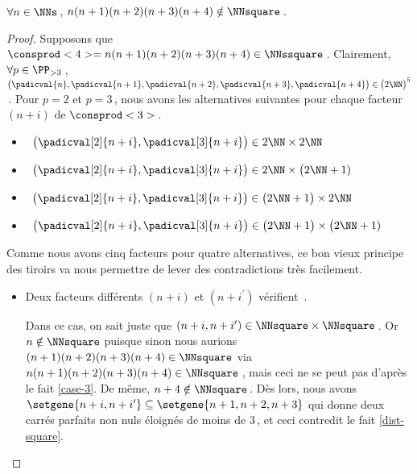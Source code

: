 \begin{fact}
	 $\forall n \in \NNs$\,, $n(n+1)(n+2)(n+3)(n+4) \notin \NNsquare$\,.
\end{fact}




\begin{proof}
    Supposons que $\consprod<4> = n(n+1)(n+2)(n+3)(n+4) \in \NNssquare$\,.
    Clairement, $\forall p \in \PP_{>3}$\,, 
    $\big( \padicval{n} , \padicval{n + 1} , \padicval{n + 2} , \padicval{n + 3} , \padicval{n + 4} \big) \in \big( 2 \NN \big)^5$\,.
    Pour $p = 2$ et $p = 3$\,, nous avons les alternatives suivantes pour chaque facteur $(n+i)$ de $\consprod<3>$\,.
    \begin{itemize}
    	\smallskip
		\item {}\,
		$\big( \padicval[2]{n + i} , \padicval[3]{n + i} \big) \in 2 \NN \times 2 \NN$

    	\smallskip
		\item {}\,
		$\big( \padicval[2]{n + i} , \padicval[3]{n + i} \big) \in 2 \NN \times \big( 2 \NN + 1)$

    	\smallskip
		\item {}\,
		$\big( \padicval[2]{n + i} , \padicval[3]{n + i} \big) \in \big( 2 \NN + 1 \big) \times 2 \NN$

    	\smallskip
		\item {}\,
		$\big( \padicval[2]{n + i} , \padicval[3]{n + i} \big) \in \big( 2 \NN + 1 \big) \times \big( 2 \NN + 1)$
    \end{itemize}
    
    \medskip
    
    Comme nous avons cinq facteurs pour quatre alternatives, ce bon vieux principe des tiroirs va nous permettre de lever des contradictions très facilement.
    \begin{itemize}
    	\item Deux facteurs différents $(n+i)$ et $(n+i^\prime)$ vérifient \,.
		
		\smallskip
		\noindent
		Dans ce cas, on sait juste que $(n+i, n+i^\prime) \in \NNsquare \times \NNsquare$\,.
		Or $n \notin \NNsquare$ puisque sinon nous aurions $(n+1)(n+2)(n+3)(n+4) \in \NNsquare$ via $n(n+1)(n+2)(n+3)(n+4) \in \NNsquare$\,, mais ceci ne se peut pas d'après le fait \ref{case-3}.
		De même, $n+4 \notin \NNsquare$\,.
		Dès lors, nous avons $\setgene{n+i, n+i^\prime} \subseteq \setgene{n+1, n+2, n+3}$ qui donne deux carrés parfaits non nuls éloignés de moins de $3$\,, et ceci contredit le fait \ref{dist-square}.



\end{itemize}
\end{proof}
